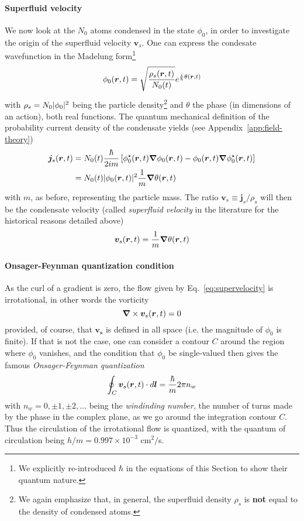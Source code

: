 \paragraph{Superfluid velocity}
We now look at the $N_0$ atoms condensed in the state $\phi_0$, in
order to investigate the origin of the superfluid velocity
$\bm{v}_s$. One can express the condesate wavefunction in the Madelung
form\footnote{We explicitly re-introduced $\hbar$ in the equations of
this Section to show their quantum nature.}
%
\begin{equation}\label{eq:madelung}
  \phi_0 (\bm{r}, t) = \sqrt{\frac{\rho_s(\bm{r},t)}{N_0(t)}} e^{\frac{i}{\hbar}\theta(\bm{r},t)}
\end{equation}
% 
with $\rho_s = N_0\vert \phi_0 \vert^2$ being the particle
density\footnote{We again emphasize that, in general, the superfluid
  density $\rho_s$ is \textbf{not} equal to the density of condensed
  atoms.}  and $\theta$ the phase (in dimensions of an action), both
real functions.
%
The quantum mechanical definition of the probability current density
of the condensate yields (see Appendix~\ref{app:field-theory})
%
\begin{align}\label{eq:bec-current}
  \bm{j}_s(\bm{r},t) & = N_0(t)\frac{\hbar}{2im}\left[\phi_0^{\star}(\bm{r},t)\bm{\nabla}\phi_0(\bm{r},t) - \phi_0(\bm{r},t)\bm{\nabla}\phi_0^{\star}(\bm{r},t)\right]\\
& = N_0(t) \vert \phi_0(\bm{r},t) \vert^2 \frac{1}{m} \bm{\nabla}\theta(\bm{r},t)
\end{align}
%
with $m$, as before, representing the particle mass. The ratio
$\bm{v}_s \equiv \bm{j}_s/\rho_s$ will then be the condensate velocity
(called \textit{superfluid velocity} in the literature for the
historical reasons detailed above)
%
\begin{equation}\label{eq:supervelocity}
  \bm{v}_s(\bm{r},t) = \frac{1}{m} \bm{\nabla}\theta(\bm{r},t)
\end{equation}
% 

\paragraph{Onsager-Feynman quantization condition}
As the curl of a gradient is zero, the flow given by
Eq.~\eqref{eq:supervelocity} is irrotational, in other words the
vorticity
%
\begin{equation}\label{eq:vorticity}
  \bm{\nabla} \times \bm{v}_s(\bm{r},t) = 0  
\end{equation}
% 
provided, of course, that $\bm{v_s}$ is defined in all space (i.e.
the magnitude of $\phi_0$ is finite). If that is not the case, one can
consider a contour $C$ around the region where $\phi_0$ vanishes, and
the condition that $\phi_0$ be single-valued then gives the famous
\textit{Onsager-Feynman quantization}
%
\begin{equation}\label{eq:feynman}
  \oint_C \bm{v}_s(\bm{r},t) \cdot d\bm{l} = \frac{\hbar}{m} 2\pi n_w
\end{equation}
% 
with $n_w = 0, \pm 1, \pm 2, \dots$ being the \textit{windinding
  number}, the number of turns made by the phase in the complex plane,
as we go around the integration contour $C$. Thus the circulation of
the irrotational flow is quantized, with the quantum of circulation
being $h/m = 0.997 \times 10^{-3}$ cm$^2/$s.


